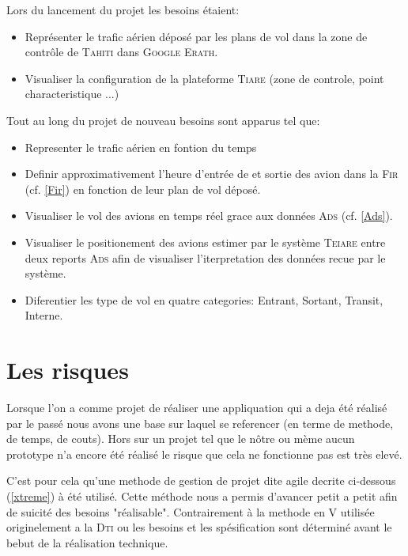 Lors du lancement du projet les besoins étaient:
\begin{itemize}
    \item Représenter le trafic aérien déposé par les plans de vol dans la zone de contrôle de \textsc{Tahiti} dans \textsc{Google Erath}.
    \item Visualiser la configuration de la plateforme \textsc{Tiare} (zone de controle, point characteristique ...)
\end{itemize}
Tout au long du projet de nouveau besoins sont apparus tel que:
\begin{itemize}
    \item Representer le trafic aérien en fontion du temps
    \item Definir approximativement l'heure d'entrée de et sortie des avion dans la \textsc{Fir} (cf. \vref{Fir}) en fonction de leur plan de vol déposé.
    \item Visualiser le vol des avions en temps réel grace aux données \textsc{Ads} (cf. \vref{Ads}).
    \item Visualiser le positionement des avions estimer par le système \textsc{Teiare} entre deux reports \textsc{Ads} afin de visualiser l'iterpretation des données recue par le système.
    \item Diferentier les type de vol en quatre categories: Entrant, Sortant, Transit, Interne. 
\end{itemize}

\section{Les risques}
Lorsque l'on a comme projet de réaliser une appliquation qui a deja été réalisé par le passé nous avons une base sur laquel se referencer (en terme de methode, de temps, de couts). Hors sur un projet tel que le nôtre ou mème aucun prototype n'a encore été réalisé le risque que cela ne fonctionne pas est très elevé.

C'est pour cela qu'une methode de gestion de projet dite agile decrite ci-dessous (\vref{xtreme}) à été utilisé. Cette méthode nous a permis d'avancer petit a petit afin de suicité des besoins "réalisable". Contrairement à la methode en V utilisée originelement a la \textsc{Dti} ou les besoins et les spésification sont déterminé avant le bebut de la réalisation technique.
